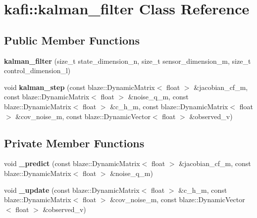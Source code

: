 \hypertarget{classkafi_1_1kalman__filter}{}\section{kafi\+:\+:kalman\+\_\+filter Class Reference}
\label{classkafi_1_1kalman__filter}
\subsection*{Public Member Functions}
\begin{DoxyCompactItemize}
\item 
\mbox{\label{classkafi_1_1kalman__filter_a8840e542475fe52d075f4f7ca217e430}} 
{\bfseries kalman\+\_\+filter} (size\+\_\+t state\+\_\+dimension\+\_\+n, size\+\_\+t sensor\+\_\+dimension\+\_\+m, size\+\_\+t control\+\_\+dimension\+\_\+l)
\item 
\mbox{\label{classkafi_1_1kalman__filter_aa4888172602a28b5ba64fe82fdd755d7}} 
void {\bfseries kalman\+\_\+step} (const blaze\+::\+Dynamic\+Matrix$<$ float $>$ \&jacobian\+\_\+cf\+\_\+m, const blaze\+::\+Dynamic\+Matrix$<$ float $>$ \&noise\+\_\+q\+\_\+m, const blaze\+::\+Dynamic\+Matrix$<$ float $>$ \&c\+\_\+h\+\_\+m, const blaze\+::\+Dynamic\+Matrix$<$ float $>$ \&cov\+\_\+noise\+\_\+m, const blaze\+::\+Dynamic\+Vector$<$ float $>$ \&observed\+\_\+v)
\end{DoxyCompactItemize}
\subsection*{Private Member Functions}
\begin{DoxyCompactItemize}
\item 
\mbox{\label{classkafi_1_1kalman__filter_a1450ee00ac92b310e8cdb5521fc14db7}} 
void {\bfseries \+\_\+predict} (const blaze\+::\+Dynamic\+Matrix$<$ float $>$ \&jacobian\+\_\+cf\+\_\+m, const blaze\+::\+Dynamic\+Matrix$<$ float $>$ \&noise\+\_\+q\+\_\+m)
\item 
\mbox{\label{classkafi_1_1kalman__filter_aea3254ded3e403461e66e5b4a2f5dafb}} 
void {\bfseries \+\_\+update} (const blaze\+::\+Dynamic\+Matrix$<$ float $>$ \&c\+\_\+h\+\_\+m, const blaze\+::\+Dynamic\+Matrix$<$ float $>$ \&cov\+\_\+noise\+\_\+m, const blaze\+::\+Dynamic\+Vector$<$ float $>$ \&observed\+\_\+v)
\end{DoxyCompactItemize}
